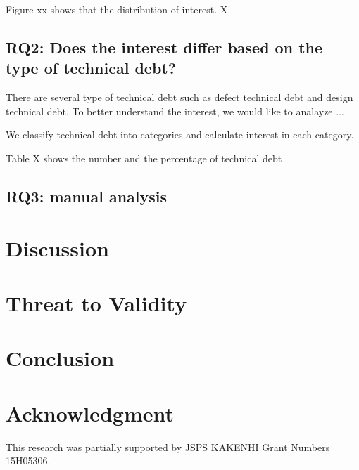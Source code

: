 \documentclass[conference]{IEEEtran}
\begin{document}
Figure xx shows that the distribution of interest. X



\subsection{RQ2: Does the interest differ based on the type of technical debt?}
There are several type of technical debt such as defect technical debt and design technical debt. 
To better understand the interest, we would like to analayze ...

We classify technical debt into categories and calculate interest in each category.

Table X shows the number and the percentage of technical debt 


\subsection{RQ3: manual analysis}




\section{Discussion}



\section{Threat to Validity}




\section{Conclusion}
%

\section*{Acknowledgment}
This research was partially supported by JSPS KAKENHI Grant Numbers 15H05306.


%

\end{document}
